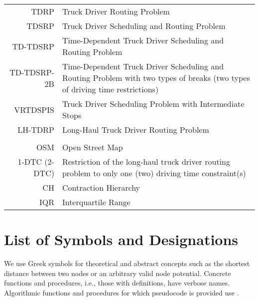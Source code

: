 \begin{tabular}{rp{}}
	TDRP          & Truck Driver Routing Problem                                                                                                 \\
	TDSRP         & Truck Driver Scheduling and Routing Problem                                                                                  \\
	TD-TDSRP      & Time-Dependent Truck Driver Scheduling and Routing Problem                                                                   \\
	TD-TDSRP-2B   & Time-Dependent Truck Driver Scheduling and Routing Problem with two types of breaks (two types of driving time restrictions) \\
	VRTDSPIS      & Truck Driver Scheduling Problem with Intermediate Stops                                                                      \\
	LH-TDRP       & Long-Haul Truck Driver Routing Problem                                                                                       \\
	\vspace{2\baselineskip}                                                                                                                      \\
	OSM           & Open Street Map                                                                                                              \\
	1-DTC (2-DTC) & Restriction of the long-haul truck driver routing problem to only one (two) driving time constraint(s)                       \\
	CH            & Contraction Hierarchy                                                                                                        \\
	IQR           & Interquartile Range
\end{tabular}



\section{List of Symbols and Designations}
\label{app:symbols}

We use Greek symbols for theoretical and abstract concepts such as the shortest distance between two nodes or an arbitrary valid node potential. Concrete functions and procedures, i.e., those with definitions, have verbose names. Algorithmic functions and procedures for which pseudocode is provided use .

